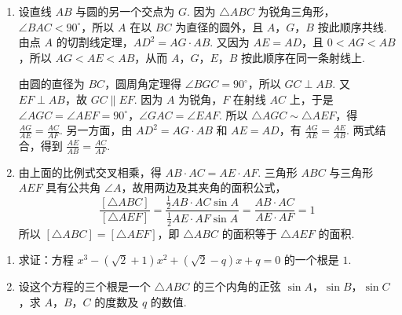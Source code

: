 \documentclass[UTF8,a4paper,oneside,11pt]{ctexbook}
\begin{document}
\begin{solution}
\begin{enumerate}
\item 设直线 \(AB\) 与圆的另一个交点为 \(G\). 因为 \(\triangle ABC\) 为锐角三角形，\(\angle BAC<90^{\circ}\)，所以 \(A\) 在以 \(BC\) 为直径的圆外，且 \(A\)，\(G\)，\(B\) 按此顺序共线. 由点 \(A\) 的切割线定理，\(AD^2=AG\cdot AB\). 又因为 \(AE=AD\)，且 \(0<AG<AB\)，所以 \(AG<AE<AB\)，从而 \(A\)，\(G\)，\(E\)，\(B\) 按此顺序在同一条射线上.

由圆的直径为 \(BC\)，圆周角定理得 \(\angle BGC=90^{\circ}\)，所以 \(GC\perp AB\). 又 \(EF\perp AB\)，故 \(GC\parallel EF\). 因为 \(A\) 为锐角，\(F\) 在射线 \(AC\) 上，于是 \(\angle AGC=\angle AEF=90^{\circ}\)，\(\angle GAC=\angle EAF\). 所以 \(\triangle AGC\sim\triangle AEF\)，得 \(\frac{AG}{AE}=\frac{AC}{AF}\). 另一方面，由 \(AD^2=AG\cdot AB\) 和 \(AE=AD\)，有 \(\frac{AG}{AE}=\frac{AE}{AB}\). 两式结合，得到 \(\frac{AE}{AB}=\frac{AC}{AF}\).

\item 由上面的比例式交叉相乘，得 \(AB\cdot AC=AE\cdot AF\). 三角形 \(ABC\) 与三角形 \(AEF\) 具有公共角 \(\angle A\)，故用两边及其夹角的面积公式，
\[
\frac{[\triangle ABC]}{[\triangle AEF]}=\frac{\frac12 AB\cdot AC\sin A}{\frac12 AE\cdot AF\sin A}=\frac{AB\cdot AC}{AE\cdot AF}=1
\]
所以 \([\triangle ABC]=[\triangle AEF]\)，即 \(\triangle ABC\) 的面积等于 \(\triangle AEF\) 的面积.
\end{enumerate}

\end{solution}

\begin{problem}
\begin{enumerate}
\item 求证：方程 \(x^{3}-(\sqrt2+1)x^{2}+(\sqrt2-q)x+q=0\) 的一个根是 \(1\).
\item 设这个方程的三个根是一个 \(\triangle ABC\) 的三个内角的正弦 \(\sin A\)，\(\sin B\)，\(\sin C\)，求 \(A\)，\(B\)，\(C\) 的度数及 \(q\) 的数值.
\end{enumerate}
\end{problem}
\end{document}
